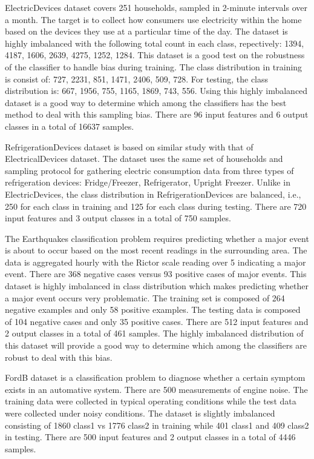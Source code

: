 \documentclass{juliacon}
\begin{document}
\vskip 6pt

ElectricDevices dataset covers 251 households, sampled in 2-minute intervals over a month. The target is to collect 
how consumers use electricity within the home based on the devices they use at a particular time of the day.  The dataset
is highly imbalanced with the following total count in each class, repectively: 1394, 4187, 1606, 2639, 4275, 1252, 1284. This dataset is a good test on the robustness of the classifier to handle bias during training. The class distribution in training is consist of: 727, 2231, 851, 1471, 2406, 509, 728. For testing, the class distribution is: 667, 1956,  755, 1165, 1869,  743,  556. Using this highly imbalanced dataset is a good way to determine which among the classifiers has the best method to deal with this sampling bias. There are 96 input features and 6 output classes in a total of 16637  samples. 

\vskip 6pt

RefrigerationDevices dataset is based on similar study with that of ElectricalDevices dataset. The dataset uses the same set of households and sampling protocol for gathering electric consumption data from three types of refrigeration devices: Fridge/Freezer, Refrigerator, Upright Freezer. Unlike in ElectricDevices, the class distribution in RefrigerationDevices are balanced, i.e., 250 for each class in training and 125 for each class during testing. There are 720 input features and 3 output classes in a total of 
750 samples.

\vskip 6pt

The Earthquakes classification problem requires predicting whether a major event is about to occur based on the most recent readings in the surrounding area. The data is aggregated hourly with the Rictor scale reading over 5 indicating a  major event. There are 368 negative cases versus 93 positive cases of major events. This dataset is highly imbalanced in class distribution which makes predicting whether a major event occurs very problematic. The training set is composed of 264 negative examples and only 58 positive examples. The testing data is composed of 104 negative cases and only 35 positive cases.
There are 512 input features and 2 output classes in a total of 461 samples. The highly imbalanced distribution of this dataset will provide a good way to determine which among the classifiers are robust to deal with this bias.

\vskip 6pt

FordB dataset is a classification problem to diagnose whether a certain symptom exists in an automative system. There are 500 measurements of engine noise. The training data were collected in typical operating conditions while the test data were collected under noisy conditions. The dataset is slightly imbalanced consisting of 1860 class1 vs 1776 class2 in training while 401 class1 and 409 class2 in testing. There are 500 input features and 2 output classes in a total of 4446 samples.
\end{document}
